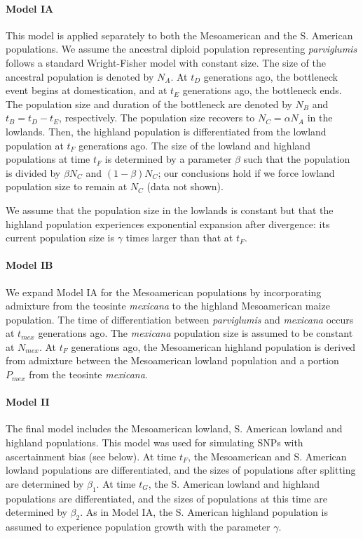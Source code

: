 \paragraph{Model IA}
This model is applied separately to both the Mesoamerican and the S. American populations.
We assume the ancestral diploid population representing \emph{parviglumis} follows a standard Wright-Fisher model with constant size.  
The size of the ancestral population is denoted by $N_A$.
At $t_D$ generations ago, the bottleneck event begins at domestication, and at $t_E$ generations ago, the bottleneck ends.  
The population size and duration of the bottleneck are denoted by $N_B$ and $t_B=t_D-t_E$, respectively.  
The population size recovers to $N_C=\alpha N_A$ in the lowlands.  
Then, the highland population is differentiated from the lowland population at $t_F$ generations ago.  
The size of the lowland and highland populations at time $t_F$ is determined by a parameter $\beta$ such that the population is divided by $\beta N_C$ and $(1-\beta)N_C$; our conclusions hold if we force lowland population size to remain at $N_C$ (data not shown).  

We assume that the population size in the lowlands is constant but that the highland population experiences exponential expansion after divergence: its current population size is $\gamma$ times larger than that at $t_F$. \\

\paragraph{Model IB}
We expand Model IA for the Mesoamerican populations by incorporating admixture from the teosinte \emph{mexicana} to the highland Mesoamerican maize population.  
The time of differentiation between \emph{parviglumis} and \emph{mexicana} occurs at $t_{mex}$ generations ago.  
The \emph{mexicana} population size is assumed to be constant at $N_{mex}$.  
At $t_F$ generations ago, the Mesoamerican highland population is derived from admixture between the Mesoamerican lowland population and a portion $P_{mex}$ from the teosinte \emph{mexicana}.\\  

\paragraph{Model II}
The final model includes the Mesoamerican lowland, S. American lowland and highland populations.  
This model was used for simulating SNPs with ascertainment bias (see below).  
At time $t_F$, the Mesoamerican and S. American lowland populations are differentiated, and the sizes of populations after splitting are determined by $\beta_1$.  
At time $t_G$, the S. American lowland and highland populations are differentiated, and the sizes of populations at this time are determined by $\beta_2$.  
As in Model IA, the S. American highland population is assumed to experience population growth with the parameter $\gamma$.\\

